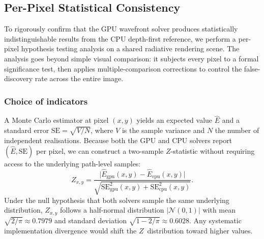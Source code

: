
\subsection{Per-Pixel Statistical Consistency}
\label{sec:stat-consistency}

To rigorously confirm that the GPU wavefront solver produces
statistically indistinguishable results from the CPU depth-first
reference, we perform a per-pixel hypothesis testing analysis on a
shared radiative rendering scene.  The analysis goes beyond simple
visual comparison: it subjects every pixel to a formal significance
test, then applies multiple-comparison corrections to control the
false-discovery rate across the entire image.

\subsubsection{Choice of indicators}

A Monte Carlo estimator at pixel $(x,y)$ yields an expected value
$\hat{E}$ and a standard error $\mathrm{SE} = \sqrt{V/N}$, where $V$ is
the sample variance and $N$ the number of independent realisations.
Because both the GPU and CPU solvers report $(\hat{E},\mathrm{SE})$
per pixel, we can construct a two-sample $Z$-statistic without
requiring access to the underlying path-level samples:
%
\begin{equation}\label{eq:z-pixel}
  Z_{x,y}
  = \frac{\bigl|\hat{E}_{\mathrm{gpu}}(x,y)
          - \hat{E}_{\mathrm{cpu}}(x,y)\bigr|}
         {\sqrt{\mathrm{SE}_{\mathrm{gpu}}^{2}(x,y)
              + \mathrm{SE}_{\mathrm{cpu}}^{2}(x,y)}}.
\end{equation}
%
Under the null hypothesis that both solvers sample the same underlying
distribution, $Z_{x,y}$ follows a half-normal distribution $|{\mathcal{N}(0,1)}|$
with mean $\sqrt{2/\pi}\approx 0.7979$ and standard deviation
$\sqrt{1-2/\pi}\approx 0.6028$.  Any systematic implementation
divergence would shift the $Z$~distribution toward higher values.

